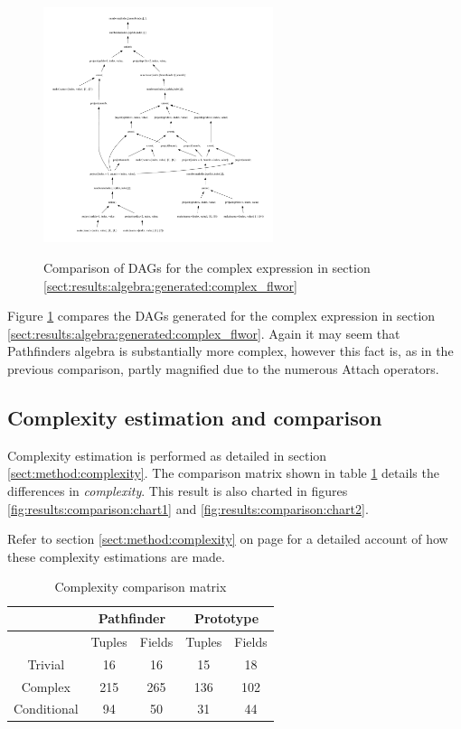 \begin{figure}[!h]
{{			\includegraphics[width=0.6\textwidth]{img/graphs/td_impl_flwor_complex_xq_relalg_dag}
			\label{fig:result:comparison:complex_pathfinder_dag}
		}
	}
	\caption{Comparison of DAGs for the complex expression in section
	\ref{sect:results:algebra:generated:complex_flwor}}
	\label{fig:results:comp:complex}	
\end{figure}

Figure \ref{fig:results:comp:complex} compares the DAGs generated for the
complex expression in section
\ref{sect:results:algebra:generated:complex_flwor}. Again it may seem that
Pathfinders algebra is substantially more complex, however this fact is,
as in the previous comparison, partly magnified due to the numerous
\textsf{Attach} operators.

\newpage
\subsection{Complexity estimation and comparison}
Complexity estimation is performed as detailed in section
\ref{sect:method:complexity}. The comparison matrix shown in table
\ref{table:result:complexity_matrix} details the differences in
\textit{complexity}. This result is also charted in figures
\ref{fig:results:comparison:chart1} and \ref{fig:results:comparison:chart2}.

Refer to section \ref{sect:method:complexity} on page
\pageref{sect:method:complexity} for a detailed account of how these complexity
estimations are made.

\begin{table}[!htp]
 \begin{center} 
 \begin{tabular}{| c | c | c || c | c |}
  \hline
   & \multicolumn{2}{|c||}{\textbf{Pathfinder}}
   & \multicolumn{2}{|c|}{\textbf{Prototype}} \\
   \hline
   & Tuples & Fields & Tuples & Fields \\  
   \hline
   Trivial & 16 & 16 & 15 & 18 \\  
   \hline
   Complex & 215 & 265 & 136 & 102 \\
   \hline
   Conditional & 94 & 50 & 31 & 44 \\  
   \hline
 \end{tabular}
\caption{Complexity comparison matrix}
\label{table:result:complexity_matrix}
 \end{center}
\end{table}

